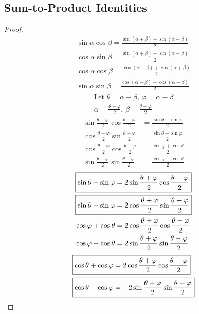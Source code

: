\documentclass{article}
\begin{document}
\subsection{Sum-to-Product Identities}
\label{proof:s2p}
\begin{proof}
	\begin{align*}
		\sin\alpha\cos\beta=\frac{\sin\left(\alpha+\beta\right)
			+\sin\left(\alpha-\beta\right)}{2} \\
		\cos\alpha\sin\beta=\frac{\sin\left(\alpha+\beta\right)
			-\sin\left(\alpha-\beta\right)}{2} \\
		\cos\alpha\cos\beta=\frac{\cos\left(\alpha-\beta\right)
			+\cos\left(\alpha+\beta\right)}{2} \\
		\sin\alpha\sin\beta=\frac{\cos\left(\alpha-\beta\right)
			-\cos\left(\alpha+\beta\right)}{2}
	\end{align*}
	\begin{gather*}
		\text{Let }\theta=\alpha+\beta,\,\varphi=\alpha-\beta \\
		\alpha=\frac{\theta+\varphi}{2},\,\beta=\frac{\theta-\varphi}{2}
	\end{gather*}
	\begin{align*}
		\sin\frac{\theta+\varphi}{2}\cos\frac{\theta-\varphi}{2}
		&=\frac{\sin\theta+\sin\varphi}{2} \\
		\cos\frac{\theta+\varphi}{2}\sin\frac{\theta-\varphi}{2}
		&=\frac{\sin\theta-\sin\varphi}{2} \\
		\cos\frac{\theta+\varphi}{2}\cos\frac{\theta-\varphi}{2}
		&=\frac{\cos\varphi+\cos\theta}{2} \\
		\sin\frac{\theta+\varphi}{2}\sin\frac{\theta-\varphi}{2}
		&=\frac{\cos\varphi-\cos\theta}{2}
	\end{align*}
	\begin{align*}
		\Aboxed{\sin\theta+\sin\varphi&=
		2\sin\frac{\theta+\varphi}{2}\cos\frac{\theta-\varphi}{2}} \\
		\Aboxed{\sin\theta-\sin\varphi&=
		2\cos\frac{\theta+\varphi}{2}\sin\frac{\theta-\varphi}{2}} \\
		\cos\varphi+\cos\theta&=
		2\cos\frac{\theta+\varphi}{2}\cos\frac{\theta-\varphi}{2} \\
		\cos\varphi-\cos\theta&=
		2\sin\frac{\theta+\varphi}{2}\sin\frac{\theta-\varphi}{2} \\
	\end{align*}
	\begin{align*}
		\Aboxed{\cos\theta+\cos\varphi&=
		2\cos\frac{\theta+\varphi}{2}\cos\frac{\theta-\varphi}{2}} \\
		\Aboxed{\cos\theta-\cos\varphi&=
		-2\sin\frac{\theta+\varphi}{2}\sin\frac{\theta-\varphi}{2}} \\
	\end{align*}
\end{proof}
\end{document}
